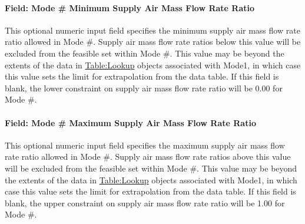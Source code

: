 \paragraph{Field: Mode \# Minimum Supply Air Mass Flow Rate Ratio}
This optional numeric input field specifies the minimum supply air mass flow rate ratio allowed in Mode \#. Supply air mass flow rate ratios below this value will be excluded from the feasible set within Mode \#. This value may be beyond the extents of the data in \hyperref[tablelookup]{Table:Lookup} objects associated with Mode1, in which case this value sets the limit for extrapolation from the data table. If this field is blank, the lower constraint on supply air mass flow rate ratio will be 0.00 for Mode \#.

\paragraph{Field: Mode \# Maximum Supply Air Mass Flow Rate Ratio}
This optional numeric input field specifies the maximum supply air mass flow rate ratio allowed in Mode \#. Supply air mass flow rate ratios above this value will be excluded from the feasible set within Mode \#. This value may be beyond the extents of the data in \hyperref[tablelookup]{Table:Lookup} objects associated with Mode1, in which case this value sets the limit for extrapolation from the data table. If this field is blank, the upper constraint on supply air mass flow rate ratio will be 1.00 for Mode \#.

